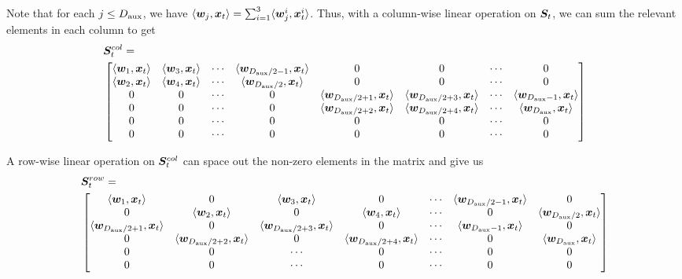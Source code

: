 Note that for each $j \le D_{\text{aux}}$, we have $ \langle {\bm{w}}_j, {\bm{x}}_t \rangle = \sum_{i=1}^{3}  \langle {\bm{w}}_j^i, {\bm{x}}_t^i \rangle$.  Thus, with a column-wise linear operation  on ${\bm{S}}_t$, we can sum the relevant elements in each column to get
\begin{align*}
    &{\bm{S}}^{col}_t  = \\& \begin{bmatrix}
     \langle {\bm{w}}_1, {\bm{x}}_t \rangle &  \langle {\bm{w}}_3, {\bm{x}}_t \rangle &   \cdots & \langle {\bm{w}}_{ D_{\text{aux}}/2 - 1}, {\bm{x}}_t \rangle  & 0 & 0  & \cdots & 0  \\
     \langle {\bm{w}}_2, {\bm{x}}_t \rangle &  \langle {\bm{w}}_4, {\bm{x}}_t \rangle &  \cdots & \langle {\bm{w}}_{ D_{\text{aux}}/2 }, {\bm{x}}_t \rangle  & 0 & 0  & \cdots & 0  \\
     0 &  0 & \cdots & 0  &  \langle {\bm{w}}_{ D_{\text{aux}} / 2 + 1 }, {\bm{x}}_t \rangle & \langle {\bm{w}}_{ D_{\text{aux}} / 2 + 3 }, {\bm{x}}_t \rangle  & \cdots & \langle {\bm{w}}_{ D_{\text{aux}} - 1 }, {\bm{x}}_t \rangle  \\
    0 &  0 &  \cdots & 0  &  \langle {\bm{w}}_{ D_{\text{aux}} / 2 + 2 }, {\bm{x}}_t \rangle & \langle {\bm{w}}_{ D_{\text{aux}} / 2 + 4 }, {\bm{x}}_t \rangle & \cdots & \langle {\bm{w}}_{ D_{\text{aux}} }, {\bm{x}}_t \rangle  \\
     0 &  0 &  \cdots & 0  &  0 &  0 & \cdots & 0   \\
     0 &  0 &  \cdots & 0  &  0 &  0 & \cdots & 0  
\end{bmatrix}
\end{align*}




A row-wise linear operation on ${\bm{S}}^{col}_t$ can space out the non-zero elements in the matrix and give us
\begin{align*}
    &{\bm{S}}^{row}_t  = \\& \begin{bmatrix}
     \langle {\bm{w}}_1, {\bm{x}}_t \rangle & 0 & \langle {\bm{w}}_3, {\bm{x}}_t \rangle & 0 &  \cdots & \langle {\bm{w}}_{ D_{\text{aux}}/2 - 1}, {\bm{x}}_t \rangle  & 0   \\
     0 & \langle {\bm{w}}_2, {\bm{x}}_t \rangle & 0 & \langle {\bm{w}}_4, {\bm{x}}_t \rangle &  \cdots & 0 & \langle {\bm{w}}_{ D_{\text{aux}}/2 }, {\bm{x}}_t \rangle   \\
     \langle {\bm{w}}_{ D_{\text{aux}} / 2 +  1}, {\bm{x}}_t \rangle & 0 & \langle {\bm{w}}_{ D_{\text{aux}} / 2 +  3}, {\bm{x}}_t \rangle & 0 &  \cdots & \langle {\bm{w}}_{ D_{\text{aux}} - 1}, {\bm{x}}_t \rangle  & 0   \\
    0 & \langle {\bm{w}}_{ D_{\text{aux}} / 2 +  2}, {\bm{x}}_t \rangle & 0 & \langle {\bm{w}}_{ D_{\text{aux}} / 2 +  4}, {\bm{x}}_t \rangle &  \cdots & 0 & \langle {\bm{w}}_{ D_{\text{aux}} }, {\bm{x}}_t \rangle   \\
     0 &  0 &  \cdots & 0  &    \cdots & 0 &  0   \\
     0 &  0 &  \cdots & 0  &    \cdots & 0 &  0  
\end{bmatrix}
\end{align*}




